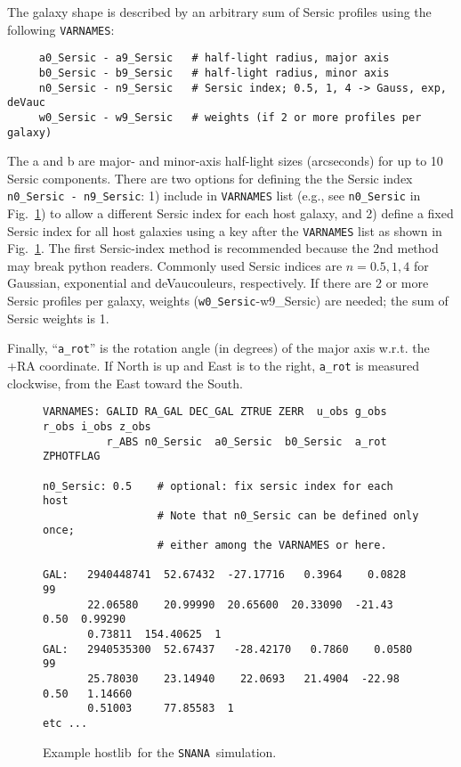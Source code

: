 \documentclass[12pt]{article}
\newcommand{\snana}{{\tt SNANA}}
\newcommand{\hostlib}{{\sc hostlib}}
\begin{document}
{The galaxy shape is described by an arbitrary sum of Sersic profiles
using the following {\tt VARNAMES}:
\begin{verbatim}
     a0_Sersic - a9_Sersic   # half-light radius, major axis
     b0_Sersic - b9_Sersic   # half-light radius, minor axis
     n0_Sersic - n9_Sersic   # Sersic index; 0.5, 1, 4 -> Gauss, exp, deVauc
     w0_Sersic - w9_Sersic   # weights (if 2 or more profiles per galaxy)
\end{verbatim}
%
The a and b are major- and minor-axis half-light sizes (arcseconds) 
for up to 10 Sersic components.
There are two options for defining the the Sersic index 
{\tt n0\_Sersic - n9\_Sersic}: 
1) include in {\tt VARNAMES} list 
(e.g., see {\tt n0\_Sersic} in Fig.~\ref{fig:hostlib})
to allow a different Sersic index for each host galaxy, and 
2) define a fixed Sersic index for all host galaxies using 
a key after the {\tt VARNAMES} list as shown in Fig.~\ref{fig:hostlib}.
The first Sersic-index method is recommended because the 
2nd method may break python readers.
Commonly used Sersic indices are $n=0.5, 1, 4$ 
for Gaussian, exponential and  deVaucouleurs,
respectively. 
If there are 2 or more Sersic profiles per galaxy, 
weights ({\tt w0\_Sersic}-{w9\_Sersic}) are needed;
the sum of Sersic weights is 1.


Finally, ``{\tt a\_rot}'' 
is the rotation angle (in degrees) of the major axis  w.r.t. 
the +RA coordinate.  If North is up and East is to the right, 
{\tt a\_rot} is measured clockwise, from the East toward the South.



\begin{figure}[!] 
\begin{center}
\caption{  Example \hostlib\ for the \snana\ simulation. }
\label{fig:hostlib}
\begin{Verbatim}[frame=single]
VARNAMES: GALID RA_GAL DEC_GAL ZTRUE ZERR  u_obs g_obs r_obs i_obs z_obs
          r_ABS n0_Sersic  a0_Sersic  b0_Sersic  a_rot  ZPHOTFLAG

n0_Sersic: 0.5    # optional: fix sersic index for each host
                  # Note that n0_Sersic can be defined only once;
                  # either among the VARNAMES or here.

GAL:   2940448741  52.67432  -27.17716   0.3964    0.0828    99  
       22.06580    20.99990  20.65600  20.33090  -21.43 0.50  0.99290  
       0.73811  154.40625  1
GAL:   2940535300  52.67437   -28.42170   0.7860    0.0580    99    
       25.78030    23.14940    22.0693   21.4904  -22.98 0.50   1.14660  
       0.51003     77.85583  1
etc ...
\end{Verbatim}
\end{center}
\end{figure}

}
\end{document}
